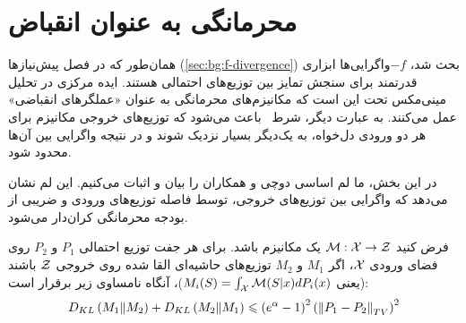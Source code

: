 \section{محرمانگی به عنوان انقباض}
\label{sec:privacy-contraction}

همان‌طور که در فصل پیش‌نیازها (\ref{sec:bg:f-divergence}) بحث شد، $-f$واگرایی‌ها ابزاری قدرتمند برای سنجش تمایز بین توزیع‌های احتمالی هستند. ایده مرکزی در تحلیل مینی‌مکس تحت  این است که مکانیزم‌های محرمانگی به عنوان «عملگرهای انقباضی» عمل می‌کنند. به عبارت دیگر، شرط \LDP\ باعث می‌شود که توزیع‌های خروجی مکانیزم برای هر دو ورودی دل‌خواه، به یک‌دیگر بسیار نزدیک شوند و در نتیجه واگرایی بین آن‌ها محدود شود.

در این بخش، ما لم اساسی دوچی و همکاران \cite{duchi2018} را بیان و اثبات می‌کنیم. این لم نشان می‌دهد که واگرایی  بین توزیع‌های خروجی، توسط فاصله  توزیع‌های ورودی و ضریبی از بودجه محرمانگی \al کران‌دار می‌شود.
\begin{قضیه}
\label{thm:ldp-contraction}
فرض کنید $\mech: \Xset \to \Zset$ یک مکانیزم \LDP باشد. برای هر جفت توزیع احتمالی $P_1$ و $P_2$ روی فضای ورودی $\Xset$، اگر $M_1$ و $M_2$ توزیع‌های حاشیه‌ای القا شده روی خروجی $\Zset$ باشند (یعنی $M_i(S) = \int_{\Xset} \mech(S|x) dP_i(x)$)، آنگاه نامساوی زیر برقرار است:
\begin{equation}
\label{eq:kl-contraction-bound}
D_{KL}\left(M_1 \| M_2\right) + D_{KL}\left(M_2 \| M_1\right) \leqslant \left(e^{\alpha} - 1\right)^2 \left(\left\lVert P_1 - P_2\right\rVert_{TV}\right)^2
\end{equation}
\end{قضیه}

